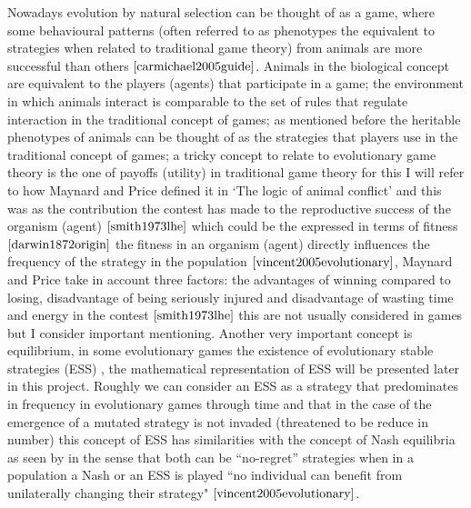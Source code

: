 Nowadays evolution by natural selection can be thought of as a game, where some behavioural patterns (often referred to as phenotypes the equivalent to strategies when related to traditional game theory) from animals are more successful than others $\cite{carmichael2005guide}$. Animals in the biological concept are equivalent to the players (agents) that participate in a game; the environment in which animals interact is comparable to the set of rules that regulate interaction in the traditional concept of games; as mentioned before the heritable phenotypes of animals can be thought of as the strategies that players use in the traditional concept of games; a tricky concept to relate to evolutionary game theory is the one of payoffs (utility) in traditional game theory  for this I will refer to how Maynard and Price defined it in `The logic of animal conflict' and this was as the contribution the contest has made to the reproductive success of the organism (agent) $\cite{smith1973lhe}$ which could be the expressed in terms of fitness  $\cite{darwin1872origin}$ the fitness in an organism (agent) directly influences the frequency of the strategy in the population $\cite{vincent2005evolutionary}$, Maynard and Price take in account three factors: the advantages of winning compared to losing, disadvantage of being seriously injured and disadvantage of wasting time and energy in the contest $\cite{smith1973lhe}$ this are not usually considered in games but I consider important mentioning. Another very important concept is equilibrium, in some evolutionary games the existence of evolutionary stable strategies (ESS) , the mathematical representation of  ESS will be presented later in this project. Roughly we can consider an ESS as a strategy that predominates in frequency in evolutionary games through time and that in the case of the emergence of a mutated strategy is not invaded (threatened to be reduce in number) this concept of ESS has similarities with the concept of Nash equilibria as seen by in the sense that both can be ``no-regret'' strategies when in a population a Nash or an ESS is played ``no individual can benefit from unilaterally changing their strategy" $\cite{vincent2005evolutionary}$.  

